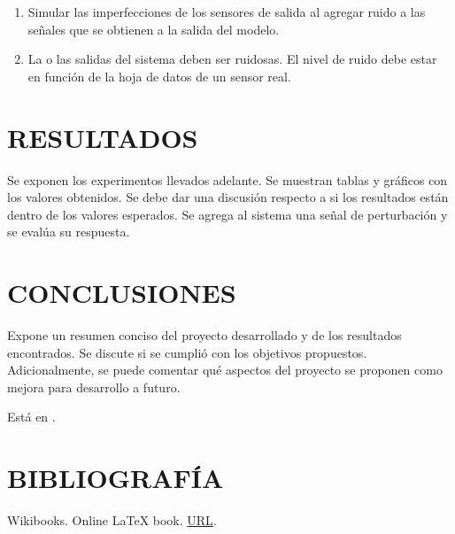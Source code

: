 \documentclass{article}
\begin{document}
\begin{enumerate}

    \item Simular las imperfecciones de los sensores de salida al agregar ruido a las señales que se obtienen a la salida del modelo.

    \item La o las salidas del sistema deben ser ruidosas. El nivel de ruido debe estar en función de la hoja de datos de un sensor real.
\end{enumerate}






\section{RESULTADOS}
\label{sec:RESULTADOS}

Se exponen los experimentos llevados adelante. Se muestran tablas y gráficos con los valores obtenidos. Se debe dar una discusión respecto a si los resultados están dentro de los valores esperados. Se agrega al sistema una señal de perturbación y se evalúa su respuesta.


\section{CONCLUSIONES}
\label{sec:CONCLUSIONES}

Expone un resumen conciso del proyecto desarrollado y de los resultados encontrados. Se discute si se cumplió con los objetivos propuestos. Adicionalmente, se puede comentar qué aspectos del proyecto se proponen como mejora para desarrollo a futuro.

Está en \cite{masas}.






\section*{BIBLIOGRAFÍA}

Wikibooks. Online \LaTeX{} book. \href{https://en.wikibooks.org/wiki/LaTeX/}{URL}.
\end{document}
